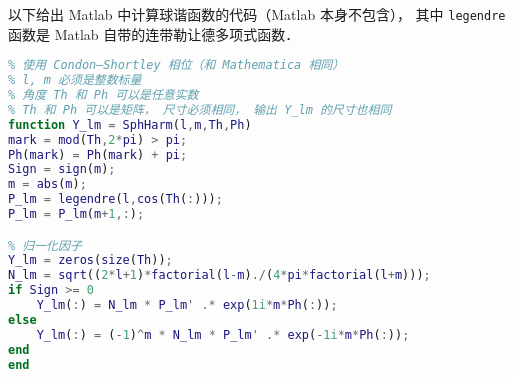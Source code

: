 
以下给出 Matlab 中计算球谐函数的代码（Matlab 本身不包含）， 其中 \lstinline|legendre| 函数是 Matlab 自带的连带勒让德多项式函数．

\begin{lstlisting}[language=matlab]
% 计算球谐函数 Y_{lm}
% 使用 Condon–Shortley 相位（和 Mathematica 相同）
% l, m 必须是整数标量
% 角度 Th 和 Ph 可以是任意实数
% Th 和 Ph 可以是矩阵， 尺寸必须相同， 输出 Y_lm 的尺寸也相同
function Y_lm = SphHarm(l,m,Th,Ph)
mark = mod(Th,2*pi) > pi;
Ph(mark) = Ph(mark) + pi;
Sign = sign(m);
m = abs(m);
P_lm = legendre(l,cos(Th(:)));
P_lm = P_lm(m+1,:);

% 归一化因子
Y_lm = zeros(size(Th));
N_lm = sqrt((2*l+1)*factorial(l-m)./(4*pi*factorial(l+m)));
if Sign >= 0
    Y_lm(:) = N_lm * P_lm' .* exp(1i*m*Ph(:));
else
    Y_lm(:) = (-1)^m * N_lm * P_lm' .* exp(-1i*m*Ph(:));
end
end
\end{lstlisting}
